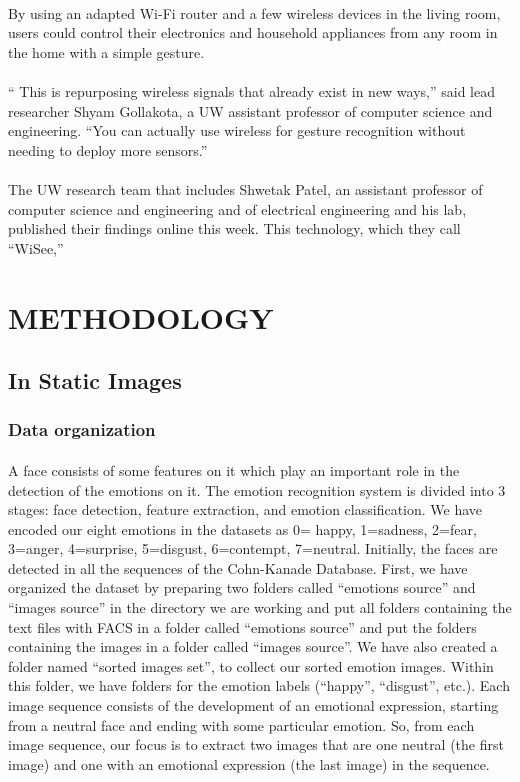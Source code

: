 \documentclass[a4paper,12pt,oneside]{article}
\begin{document}
\paragraph{}
By using an adapted Wi-Fi router and a few wireless devices in the living room, users
could control their electronics and household appliances from any room in the home with a
simple gesture.
\paragraph{}
“ This is repurposing wireless signals that already exist in new ways,” said lead researcher
Shyam Gollakota, a UW assistant professor of computer science and engineering. “You can
actually use wireless for gesture recognition without needing to deploy more sensors.”
\paragraph{}
The UW research team that includes Shwetak Patel, an assistant professor of computer
science and engineering and of electrical engineering and his lab, published their findings online
this week. This technology, which they call “WiSee,”


\newpage
\section{METHODOLOGY}
\subsection{In Static Images}

\subsubsection{Data organization}
\paragraph{}
A face consists of some features on it which play an
important role in the detection of the emotions on it. The
emotion recognition system is divided into 3 stages: face
detection, feature extraction, and emotion classification.
We have encoded our eight emotions in the datasets as
{0= happy, 1=sadness, 2=fear, 3=anger, 4=surprise,
5=disgust, 6=contempt, 7=neutral}. Initially, the faces
are detected in all the sequences of the Cohn-Kanade
Database. First, we have organized the dataset by
preparing two folders called “emotions source” and
“images source” in the directory we are working and put
all folders containing the text files with FACS in a folder
called “emotions source” and put the folders containing
the images in a folder called “images source”. We have
also created a folder named “sorted images set”, to
collect our sorted emotion images. Within this folder, we
have folders for the emotion labels (“happy”, “disgust”,
etc.). Each image sequence consists of the development
of an emotional expression, starting from a neutral face
and ending with some particular emotion. So, from each
image sequence, our focus is to extract two images that
are one neutral (the first image) and one with an
emotional expression (the last image) in the sequence.
\end{document}

